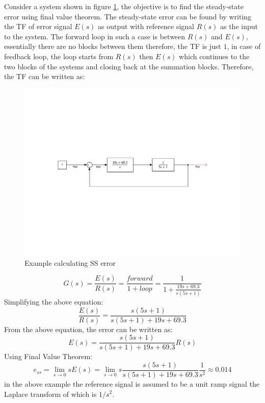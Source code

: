 Consider a system shown in figure \ref{Fig_CalculatingSSError}, the objective is to find the steady-state error using final value theorem. The steady-state error can be found by writing the TF of error signal $E(s)$ as output with reference signal $R(s)$ as the input to the system. The forward loop in such a case is between $R(s)$ and $E(s)$, essentially there are no blocks between them therefore, the TF is just $1$, in case of feedback loop, the loop starts from $R(s)$ then $E(s)$ which continues to the two blocks of the systems and closing back at the summation blocks. Therefore, the TF can be written as:
\begin{figure}[h!]
	\centering
	\includegraphics[width=\linewidth]{Bilder/CalculatingSSError.pdf}
	\caption{Example calculating SS error}
	\label{Fig_CalculatingSSError}
\end{figure}
\begin{equation}
	G(s) = \frac{E(s)}{R(s)} = \frac{forward}{1 + loop} = \frac{1}{1 + \frac{19s + 69.3}{s(5s + 1)}}
\end{equation}
Simplifying the above equation:
\begin{equation}
	\frac{E(s)}{R(s)} = \frac{s(5s + 1)}{s(5s + 1) + 19s + 69.3}
\end{equation}
From the above equation, the error can be written as:
\begin{equation}
	E(s) = \frac{s(5s + 1)}{s(5s + 1) + 19s + 69.3} R(s)
\end{equation}
Using Final Value Theorem:
\begin{equation}
	e_{ss} = \lim_{s\to 0} s E(s) = \lim_{s\to 0} s \frac{s(5s + 1)}{s(5s + 1) + 19s + 69.3} \frac{1}{s^2} \approx 0.014
\end{equation}
in the above example the reference signal is assumed to be a unit ramp signal the Laplace transform of which is $1/s^2$.

